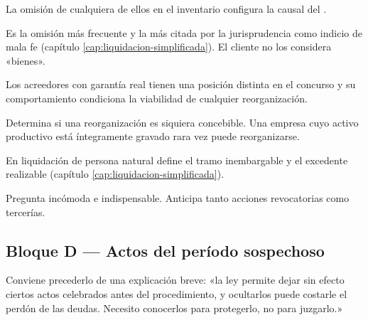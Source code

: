 \begin{cuestionario}
  {La omisión de cualquiera de ellos en el inventario configura la causal del
   .}

  {Es la omisión más frecuente y la más citada por la jurisprudencia como indicio de mala
  fe (capítulo \ref{cap:liquidacion-simplificada}). El cliente no los considera «bienes».}

  {Los acreedores con garantía real tienen una posición distinta en el concurso y su
  comportamiento condiciona la viabilidad de cualquier reorganización.}

  {Determina si una reorganización es siquiera concebible. Una empresa cuyo activo
  productivo está íntegramente gravado rara vez puede reorganizarse.}

  {En liquidación de persona natural define el tramo inembargable y el excedente
  realizable (capítulo \ref{cap:liquidacion-simplificada}).}

  {Pregunta incómoda e indispensable. Anticipa tanto acciones revocatorias como
  tercerías.}
\end{cuestionario}

\subsection{Bloque D — Actos del período sospechoso}

\begin{practica}
Conviene precederlo de una explicación breve: «la ley permite dejar sin efecto ciertos
actos celebrados antes del procedimiento, y ocultarlos puede costarle el perdón de las
deudas. Necesito conocerlos para protegerlo, no para juzgarlo.»
\end{practica}

